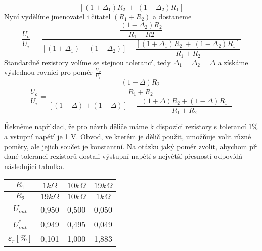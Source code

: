 \begin{example}
{\begin{equation*}
{        [(1+\Delta_1) R_2\ +\ (1-\Delta_2) R_1] }
  \end{equation*}
  } %
  Nyní vydělíme jmenovatel i čitatel $(R_1 + R_2)$ a dostaneme 
  \begin{equation*}\label{TEO:eq_divider_2}
    \frac{U_o}{U_i}\ =\dfrac{\dfrac{(1-\Delta_2) R_2}{R_1+R2}}{[(1+\Delta_1)+(1-\Delta_2)] - 
    \dfrac{[(1+\Delta_1) R_2\ +\ (1-\Delta_2) R_1]}{R_1+R_2} }
  \end{equation*}
  Standardně rezistory volíme se stejnou tolerancí, tedy $\Delta_1 = \Delta_2 = \Delta$ a získáme 
  výslednou rovnici pro poměr $\frac{U_o}{U_i}$ 
  \begin{equation}
     \dfrac{U_o}{U_i} = \dfrac{\dfrac{(1-\Delta) R_2}{R_1+R_2}}{[(1+\Delta)+(1-\Delta)] - 
     \dfrac{[(1+\Delta)R_2 + (1-\Delta) R_1]}{R_1+R_2} }
  \end{equation}

  Řekněme například, že pro návrh děliče máme k dispozici rezistory s tolerancí 1\% a vstupní 
  napětí je 1 V. Obvod, ve kterém je dělič použit, umožňuje volit různé poměry, ale jejich součet 
  je konstantní. Na otázku jaký poměr zvolit, abychom při dané toleranci rezistorů dostali 
  výstupní napětí s největší přesností odpovídá následující tabulka.
  \vspace{1em}
  
  {\centering
   \setlength{\tabcolsep}{5pt}
   \begin{tabular}{|c|c|c|c|}
      \hline
        $R_1$                 & $1 k\Omega$  & $10 k\Omega$     & $19 k\Omega$   \\
      \hline
        $R_2$                 & $19 k\Omega$ & $10 k\Omega$     & $1 k\Omega$    \\
      \hline
        $U_{out}$             & 0,950        & 0,500            & 0,050          \\
      \hline
        $U_{out}^*$           & 0,949        & 0,495            & 0,049          \\
      \hline
        $\varepsilon_r [\%]$  & 0,101        & 1,000            & 1,883          \\
      \hline
   \end{tabular}
  \par}
  \vspace{1em}

\end{example}  
  